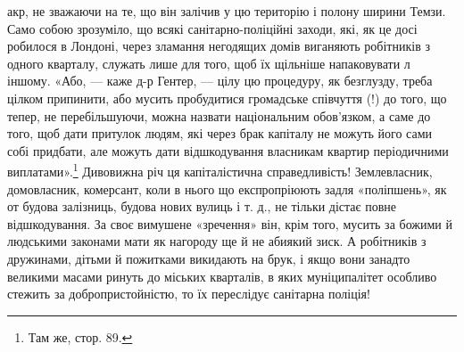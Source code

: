 \parcont{}  %
акр, не зважаючи на те, що він залічив у цю територію і полону
ширини Темзи. Само собою зрозуміло, що всякі санітарно-поліційні
заходи, які, як це досі робилося в Лондоні, через
зламання негодящих домів виганяють робітників з одного кварталу,
служать лише для того, щоб їх щільніше напаковувати
л іншому. «Або, — каже д-р Гентер, — цілу цю процедуру,
як безглузду, треба цілком припинити, або мусить пробудитися
громадське співчуття (!) до того, що тепер, не перебільшуючи,
можна назвати національним обов’язком, а саме до того, щоб
дати притулок людям, які через брак капіталу не можуть його
сами собі придбати, але можуть дати відшкодування власникам
квартир періодичними виплатами».\footnote{
Там же, стор. 89.
} Дивовижна річ ця капіталістична
справедливість! Землевласник, домовласник, комерсант,
коли в нього що експропріюють задля «поліпшень», як от
будова залізниць, будова нових вулиць і т. д., не тільки дістає
повне відшкодування. За своє вимушене «зречення» він, крім
того, мусить за божими й людськими законами мати як нагороду
ще й не абиякий зиск. А робітників з дружинами, дітьми й пожитками
викидають на брук, і якщо вони занадто великими масами
ринуть до міських кварталів, в яких муніципалітет особливо
стежить за добропристойністю, то їх переслідує санітарна поліція!

